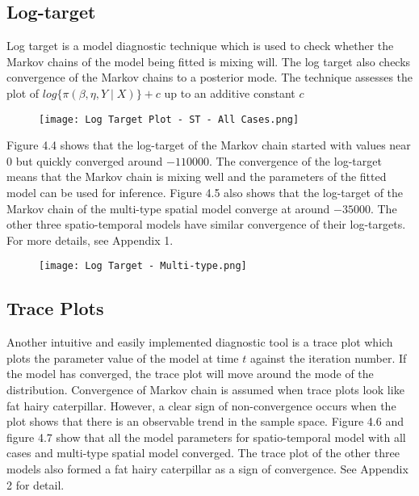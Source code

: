 \documentclass[a4paper]{thesis}
\begin{document}
\subsection{Log-target}

Log target is a model diagnostic technique which is used to check whether the Markov chains of the model being fitted is mixing will. The log target also checks convergence of the Markov chains to a posterior mode. The technique assesses the plot of $log\lbrace \pi\left( \beta, \eta, Y \mid X \right) \rbrace + c$ up to an additive constant $c$

\begin{figure}[H]
\begin{center}
\texttt{[image: Log Target Plot - ST - All Cases.png]}
\end{center}
\end{figure}

Figure 4.4 shows that the log-target of the Markov chain started with values near $0$ but quickly converged around $-110000$. The convergence of the log-target means that the Markov chain is mixing well and the parameters of the fitted model can be used for inference. Figure 4.5 also shows that the log-target of the Markov chain of the multi-type spatial model converge at around $-35000$. The other three spatio-temporal models have similar convergence of their log-targets. For more details, see Appendix 1.

\begin{figure}[H]
\begin{center}
\texttt{[image: Log Target - Multi-type.png]}
\end{center}
\end{figure}

\subsection{Trace Plots}

Another intuitive and easily implemented diagnostic tool is a trace plot
which plots the parameter value of the model at time $t$ against the iteration
number. If the model has converged, the trace plot will move around the mode of the distribution. Convergence of Markov chain is assumed when trace plots look like fat hairy caterpillar.  However, a clear sign of non-convergence occurs when the plot shows that there is an observable trend in the sample space. Figure 4.6 and figure 4.7 show that all the model parameters for spatio-temporal model with all cases and multi-type spatial model converged. The trace plot of the other three models also formed a fat hairy caterpillar as a sign of convergence. See Appendix 2 for detail.
\end{document}
